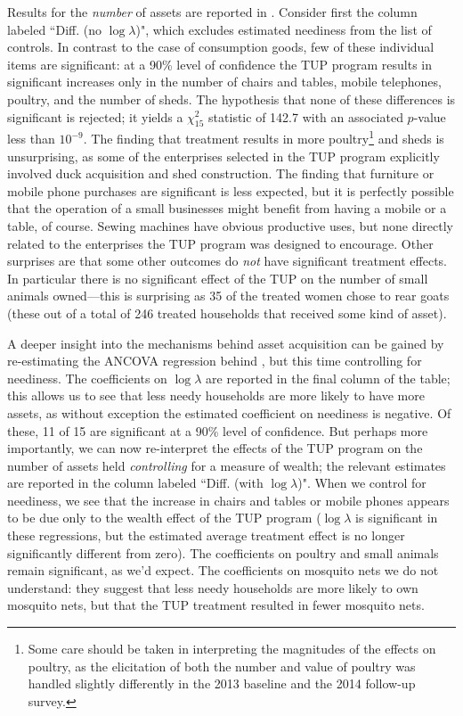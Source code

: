 \documentclass[11pt]{article}
\begin{document}
Results for the \emph{number} of assets are reported in
.  Consider first the column labeled
``Diff. (no $\log\lambda$)", which excludes estimated neediness from
the list of controls.  In contrast to the case of consumption goods,
few of these individual items are significant: at a 90\% level of
confidence the TUP program results in significant increases only in
the number of chairs and tables, mobile telephones, poultry, and the
number of sheds.  The hypothesis that none of these differences is
significant is rejected; it yields a $\chi^2_{15}$ statistic of 142.7
with an associated \(p\)-value less than $10^{-9}$.  The finding that
treatment results in more poultry\footnote{Some care should be taken in
interpreting the magnitudes of the effects on poultry, as the
elicitation of both the number and value of poultry was handled
slightly differently in the 2013 baseline and the 2014 follow-up
survey.} and sheds is unsurprising, as some of the enterprises
selected in the TUP program explicitly involved duck acquisition and
shed construction.  The finding that furniture or mobile phone
purchases are significant is less expected, but it is perfectly
possible that the operation of a small businesses might benefit from
having a mobile or a table, of course.  Sewing machines have obvious
productive uses, but none directly related to the enterprises the TUP
program was designed to encourage.  Other surprises are that some
other outcomes do \emph{not} have significant treatment effects.  In
particular there is no significant effect of the TUP on the number of
small animals owned---this is surprising as 35 of the treated women
chose to rear goats (these out of a total of 246 treated households
that received some kind of asset).

A deeper insight into the mechanisms behind asset acquisition can be
gained by re-estimating the ANCOVA regression behind
, but this time controlling for neediness.
The coefficients on $\log\lambda$ are reported in the final column of
the table; this allows us to see that less needy households are more
likely to have more assets, as without exception the estimated
coefficient on neediness is negative.  Of these, 11 of 15 are
significant at a 90\% level of confidence.  But perhaps more
importantly, we can now re-interpret the effects of the TUP program on
the number of assets held \emph{controlling} for a measure of wealth; the
relevant estimates are reported in the column labeled ``Diff. (with
$\log\lambda$)".  When we control for neediness, we see that the
increase in chairs and tables or mobile phones appears to be due only
to the wealth effect of the TUP program ($\log\lambda$ is significant
in these regressions, but the estimated average treatment effect is no
longer significantly different from zero).  The coefficients on
poultry and small animals remain significant, as we'd expect.  The
coefficients on mosquito nets we do not understand: they suggest that
less needy households are more likely to own mosquito nets, but that
the TUP treatment resulted in fewer mosquito nets. 
\end{document}
